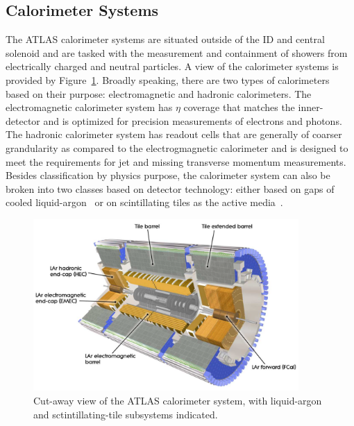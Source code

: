 \subsection{Calorimeter Systems}
\label{sec:calorimeters}

The ATLAS calorimeter systems are situated outside of the ID and central solenoid and
are tasked with the measurement and containment of showers from electrically charged and neutral particles.
A view of the calorimeter systems is provided by Figure~\ref{fig:atlas_calorimeters_cutaway}.
Broadly speaking, there are two types of calorimeters based on their purpose:
electromagnetic and hadronic calorimeters.
The electromagnetic calorimeter system has $\eta$ coverage that matches the inner-detector
and is optimized for precision measurements of electrons and photons.
The hadronic calorimeter system has readout cells that are generally of
coarser grandularity as compared to the electrogmagnetic calorimeter and
is designed to meet the requirements for jet and missing transverse momentum
measurements.
Besides classification by physics purpose, the calorimeter system can also
be broken into two classes based on detector technology: either based
on gaps of cooled liquid-argon~\cite{CERN-LHCC-96-041} or on scintillating tiles as the active media~\cite{CERN-LHCC-96-042}.

\begin{figure}[!htb]
    \begin{center}
        \includegraphics[width=0.9\textwidth]{figures/chapter2/calorimeters/atlas_calorimeter_cutaway}
        \caption{
            Cut-away view of the ATLAS calorimeter system, with liquid-argon and sctintillating-tile
            subsystems indicated.
        }
        \label{fig:atlas_calorimeters_cutaway}
    \end{center}
\end{figure}


